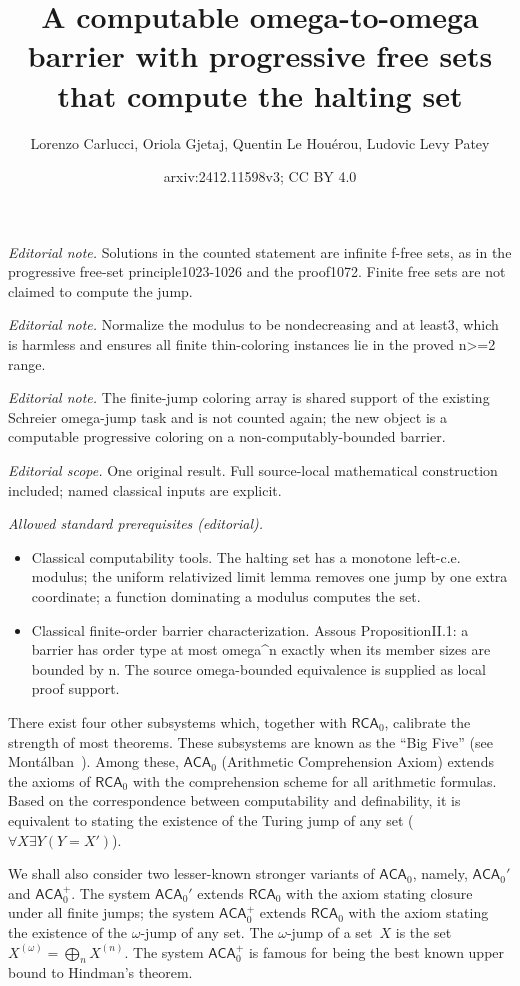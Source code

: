\documentclass[10pt,a4paper]{article}
\title{A computable omega-to-omega barrier with progressive free sets that compute the halting set}
\author{Lorenzo Carlucci, Oriola Gjetaj, Quentin Le Houérou, Ludovic Levy Patey}
\date{arxiv:2412.11598v3; CC BY 4.0}
\newcommand{\RCA}[0]{\mathsf{RCA}}
\newcommand{\ACA}[0]{\mathsf{ACA}}
\def\qt#1{``#1''}%
\numberwithin{theorem}{section}
\begin{document}
\maketitle
\noindent\textit{Editorial note.} Solutions in the counted statement are infinite f-free sets, as in the progressive free-set principle1023-1026 and the proof1072. Finite free sets are not claimed to compute the jump.\par\medskip
\noindent\textit{Editorial note.} Normalize the modulus to be nondecreasing and at least3, which is harmless and ensures all finite thin-coloring instances lie in the proved n>=2 range.\par\medskip
\noindent\textit{Editorial note.} The finite-jump coloring array is shared support of the existing Schreier omega-jump task and is not counted again; the new object is a computable progressive coloring on a non-computably-bounded barrier.\par\medskip
\noindent\textit{Editorial scope.} One original result. Full source-local mathematical construction included; named classical inputs are explicit.\par\medskip
\noindent\textit{Allowed standard prerequisites (editorial).}\begin{itemize}
\item Classical computability tools. The halting set has a monotone left-c.e. modulus; the uniform relativized limit lemma removes one jump by one extra coordinate; a function dominating a modulus computes the set.
\item Classical finite-order barrier characterization. Assous PropositionII.1: a barrier has order type at most omega\textasciicircum{}n exactly when its member sizes are bounded by n. The source omega-bounded equivalence is supplied as local proof support.
\end{itemize}\medskip
There exist four other subsystems which, together with $\RCA_0$, calibrate the strength of most theorems. These subsystems are known as the \qt{Big Five} (see Mont\'alban~\cite{montalban_open_2011}). Among these, $\ACA_0$ (Arithmetic Comprehension Axiom) extends the axioms of $\RCA_0$ with the comprehension scheme for all arithmetic formulas. Based on the correspondence between computability and definability, it is equivalent to stating the existence of the Turing jump of any set ($\forall X \exists Y (Y = X')$).

We shall also consider two lesser-known stronger variants of $\ACA_0$, namely, $\ACA_0'$ and $\ACA_0^+$. The system $\ACA_0'$ extends $\RCA_0$ with the axiom stating closure under all finite jumps; the system $\ACA_0^+$ extends $\RCA_0$ with the axiom stating the existence of the $\omega$-jump of any set. The $\omega$-jump of a set~$X$ is the set $X^{(\omega)} = \bigoplus_n X^{(n)}$. The system $\ACA_0^+$ is famous for being the best known upper bound to Hindman's theorem.%
\end{document}
